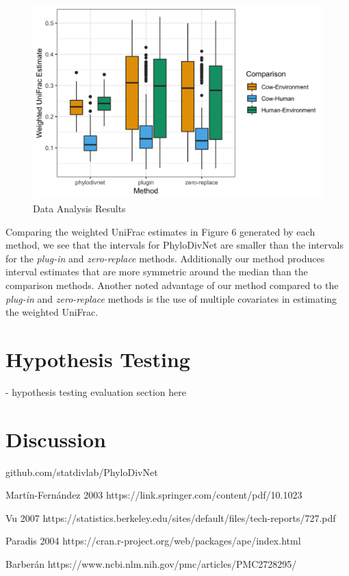 \documentclass{article}
\newcommand*{\myfont}{\fontfamily{lmtt}\selectfont}
\begin{document}
\begin{figure}[!htb]
 \captionsetup{singlelinecheck = false, format= hang, justification = raggedright, font = sf, labelsep = space}
  \caption{Data Analysis Results}
  \centering
  \includegraphics[width=\textwidth]{HDWanalysis_plots_B100_3methods.png}
\end{figure}

Comparing the weighted UniFrac estimates in Figure 6 generated by each method, we see that the intervals for {\myfont PhyloDivNet} are smaller than the intervals for the \textit{plug-in} and \textit{zero-replace} methods. Additionally our method produces interval estimates that are more symmetric around the median than the comparison methods. Another noted advantage of our method compared to the \textit{plug-in} and \textit{zero-replace} methods is the use of multiple covariates in estimating the weighted UniFrac.

\section{Hypothesis Testing}
- hypothesis testing evaluation section here

\section{Discussion}

{\myfont github.com/statdivlab/PhyloDivNet}




Mart\'in-Fern\'andez 2003 https://link.springer.com/content/pdf/10.1023%

Vu 2007
https://statistics.berkeley.edu/sites/default/files/tech-reports/727.pdf

Paradis 2004
https://cran.r-project.org/web/packages/ape/index.html

Barber\'an https://www.ncbi.nlm.nih.gov/pmc/articles/PMC2728295/
\end{document}
